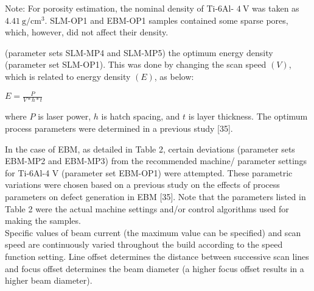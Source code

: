 \documentclass[10pt]{article}
\begin{document}
Note: For porosity estimation, the nominal density of Ti-6Al- $4 \mathrm{~V}$ was taken as $4.41 \mathrm{~g} / \mathrm{cm}^{3}$. SLM-OP1 and EBM-OP1 samples contained some sparse pores, which, however, did not affect their density.

(parameter sets SLM-MP4 and SLM-MP5) the optimum energy density (parameter set SLM-OP1). This was done by changing the scan speed $(V)$, which is related to energy density $(E)$, as below:

$E=\frac{P}{V * h * t}$

where $P$ is laser power, $h$ is hatch spacing, and $t$ is layer thickness. The optimum process parameters were determined in a previous study [35].

In the case of EBM, as detailed in Table 2, certain deviations (parameter sets EBM-MP2 and EBM-MP3) from the recommended machine/ parameter settings for Ti-6Al-4 V (parameter set EBM-OP1) were attempted. These parametric variations were chosen based on a previous study on the effects of process parameters on defect generation in EBM [35]. Note that the parameters listed in Table 2 were the actual machine settings and/or control algorithms used for making the samples.\\
Specific values of beam current (the maximum value can be specified) and scan speed are continuously varied throughout the build according to the speed function setting. Line offset determines the distance between successive scan lines and focus offset determines the beam diameter (a higher focus offset results in a higher beam diameter).
\end{document}
